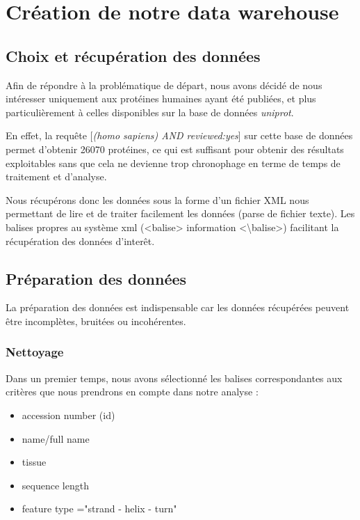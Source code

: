 \section*{Création de notre data warehouse}

\subsection*{Choix et récupération des données}


Afin de répondre à la problématique de départ, nous avons décidé de nous intéresser uniquement aux protéines humaines ayant été publiées, et plus particulièrement à celles disponibles sur la base de données \emph{uniprot}.

En effet, la requête [\emph{(homo sapiens) AND reviewed:yes}] sur cette base de données permet d'obtenir 26070 protéines, ce qui est suffisant pour obtenir des résultats exploitables sans que cela ne devienne trop chronophage en terme de temps de traitement et d'analyse.

Nous récupérons donc les données sous la forme d'un fichier XML nous permettant de lire et de traiter facilement les données (parse de fichier texte). Les balises propres au système xml (<balise> information <\textbackslash balise>) facilitant la récupération des données d'inter\^et.

\subsection*{Préparation des données}

La préparation des données est indispensable car les données récupérées peuvent être incomplètes, bruitées ou incohérentes. 

\subsubsection*{Nettoyage}
Dans un premier temps, nous avons sélectionné les balises correspondantes aux critères que nous prendrons en compte dans notre analyse :
\renewcommand\labelitemi{\textbullet}
\begin{itemize}
\item accession number (id)
\item name/full name
\item tissue
\item sequence length
\item feature type ="strand  - helix - turn"\\
\end{itemize}

